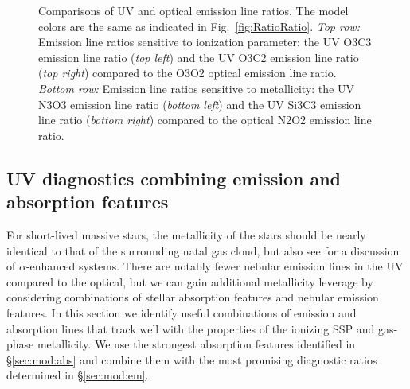 \documentclass[preprint2,trackchanges]{aastex62}
\begin{document}
\begin{figure}
\begin{center}
    \caption{Comparisons of UV and optical emission line ratios. The model colors are the same as indicated in Fig.~\ref{fig:RatioRatio}. \emph{Top row:} Emission line ratios sensitive to ionization parameter: the UV O3C3 emission line ratio (\emph{top left}) and the UV O3C2 emission line ratio (\emph{top right}) compared to the O3O2 optical emission line ratio. \emph{Bottom row:} Emission line ratios sensitive to metallicity: the UV N3O3 emission line ratio (\emph{bottom left}) and the UV Si3C3 emission line ratio (\emph{bottom right}) compared to the optical N2O2 emission line ratio.}
    \label{fig:UVopt}
  \end{center}
\end{figure}


\subsection{UV diagnostics combining emission and absorption features} \label{sec:mod:comb}

For short-lived massive stars, the metallicity of the stars should be nearly identical to that of the surrounding natal gas cloud, but also see \citet{Steidel+2016} for a discussion of $\alpha$-enhanced systems. There are notably fewer nebular emission lines in the UV compared to the optical, but we can gain additional metallicity leverage by considering combinations of stellar absorption features and nebular emission features. In this section we identify useful combinations of emission and absorption lines that track well with the properties of the ionizing SSP and gas-phase metallicity. We use the strongest absorption features identified in \S\ref{sec:mod:abs} and combine them with the most promising diagnostic ratios determined in \S\ref{sec:mod:em}.
\end{document}
